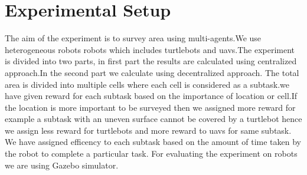 \documentclass[conference]{IEEEtran}
\begin{document}
\section{Experimental Setup}
The aim of the experiment is to survey area using multi-agents.We use heterogeneous robots robots which includes turtlebots and uavs.The experiment is divided into two parts, in first part the results are calculated using centralized approach.In the second part we calculate using decentralized approach.
The total area is divided into multiple cells where each cell is considered as a subtask.we have given reward for each subtask based on the importance of location or cell.If the location is more important to be surveyed then we assigned more reward for example a subtask with an uneven surface cannot be covered by a turtlebot hence we assign less reward for turtlebots and more reward to uavs for same subtask\cite{flushing2014mathematical}.
We have assigned efficency to each subtask based on the amount of time taken by the robot to complete a particular task.
For evaluating the experiment on robots we are using Gazebo simulator.
\end{document}
